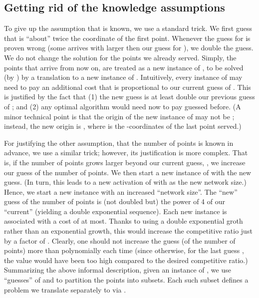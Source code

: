 \documentclass[11pt]{article}
\begin{document}
\subsection{Getting rid of the {knowledge} assumptions}
\label{subsec: onRSA}

To give up the assumption that  is known, we use a standard trick.
We first guess that  is
``about'' twice the  coordinate of the first point.
Whenever the guess for  is proven wrong (some  arrives with  larger then our guess for ),
we double the guess.
We do not change the solution for the points we already served.
Simply, the points that arrive from now on, are treated as a new instance of , to be solved (by ) by a translation to a new instance of .
Intuitively, every instance of  may need to pay an additional cost
that is proportional to our current guess of .
This is justified by the fact that
(1) the new guess is at least double our previous guess of ;
and (2) any optimal algorithm would need now to pay  guessed before.
(A minor technical point is that the origin of the new instance of  may not be
;
instead, the new origin is , where  is the -coordinates of the last point served.)



For justifying the other assumption, that the number of points is known in advance,
we use a similar trick; however, its justification is more complex.
That is, if the number of points grows larger beyond our current guess, ,
we increase our guess of the number of points.
We then start a new instance of  with the new guess.
(In turn, this leads to a new activation of  with  as the new network size.)
Hence, we start a new  instance with an increased ``network size''.
The ``new'' guess  of the number of  points is (not doubled but) the
power of 4 of our ``current''  (yielding a double exponential sequence).
Each new  instance  is associated with a cost of  at most.
Thanks to using a double exponential groth rather than an exponential growth, this would increase the competitive ratio just by a factor of .
Clearly, one should not increase the guess (of the number of points) more than polynomially each time
(since otherwise, for the last guess , the value would have been too high compared to the desired  competitive ratio.)
Summarizing the above informal description, given an instance of , we use ``guesses'' of  and 
to partition the points  into subsets.
Each such subset defines a problem we translate separately to  via .
\end{document}
